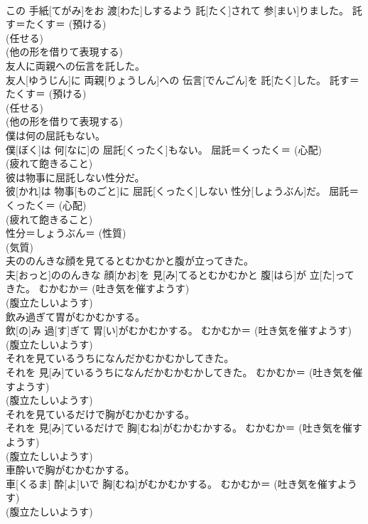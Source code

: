 \documentclass[8pt]{extreport}
\begin{document}
\begin{CJK}{UTF8}{min}
{\\	この 手紙[てがみ]をお 渡[わた]しするよう 託[たく]されて 参[まい]りました。	託す＝たくす＝ (預ける) 
\\	(任せる) 
\\	(他の形を借りて表現する) 
\\	友人に両親への伝言を託した。	
\\	友人[ゆうじん]に 両親[りょうしん]への 伝言[でんごん]を 託[たく]した。	託す＝たくす＝ (預ける) 
\\	(任せる) 
\\	(他の形を借りて表現する) 
\\	僕は何の屈託もない。	
\\	僕[ぼく]は 何[なに]の 屈託[くったく]もない。	屈託＝くったく＝ (心配) 
\\	(疲れて飽きること) 
\\	彼は物事に屈託しない性分だ。	
\\	彼[かれ]は 物事[ものごと]に 屈託[くったく]しない 性分[しょうぶん]だ。	屈託＝くったく＝ (心配) 
\\	(疲れて飽きること) 
\\	性分＝しょうぶん＝ (性質) 
\\	(気質) 
\\	夫ののんきな顔を見てるとむかむかと腹が立ってきた。	
\\	夫[おっと]ののんきな 顔[かお]を 見[み]てるとむかむかと 腹[はら]が 立[た]ってきた。	むかむか＝ (吐き気を催すようす) 
\\	(腹立たしいようす) 
\\	飲み過ぎて胃がむかむかする。	
\\	飲[の]み 過[す]ぎて 胃[い]がむかむかする。	むかむか＝ (吐き気を催すようす) 
\\	(腹立たしいようす) 
\\	それを見ているうちになんだかむかむかしてきた。	
\\	それを 見[み]ているうちになんだかむかむかしてきた。	むかむか＝ (吐き気を催すようす) 
\\	(腹立たしいようす) 
\\	それを見ているだけで胸がむかむかする。	
\\	それを 見[み]ているだけで 胸[むね]がむかむかする。	むかむか＝ (吐き気を催すようす) 
\\	(腹立たしいようす) 
\\	車酔いで胸がむかむかする。	
\\	車[くるま] 酔[よ]いで 胸[むね]がむかむかする。	むかむか＝ (吐き気を催すようす) 
\\	(腹立たしいようす) 
}
\end{CJK}
\end{document}
